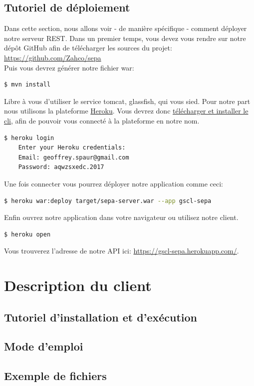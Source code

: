 \documentclass{article}
\begin{document}
    \subsection{Tutoriel de déploiement}
      Dans cette section, nous allons voir - de manière spécifique - comment déployer notre serveur REST.
      Dans un premier temps, vous devez vous rendre sur notre dépôt GitHub afin de télécharger les sources du projet:\\
      \url{https://github.com/Zahco/sepa}\\
      Puis vous devrez générer notre fichier war:
      \begin{lstlisting}[language=bash]
    $ mvn install
      \end{lstlisting}
      Libre à vous d'utiliser le service tomcat, glassfish, qui vous sied. Pour notre part nous utilisons la plateforme \href{https://www.heroku.com}{Heroku}.
      Vous devrez donc \href{https://devcenter.heroku.com/articles/heroku-cli}{télécharger et installer le cli}, afin de pouvoir vous connecté à la plateforme en notre nom.
      \begin{lstlisting}[language=bash]
    $ heroku login
    Enter your Heroku credentials:
    Email: geoffrey.spaur@gmail.com
    Password: aqwzsxedc.2017
      \end{lstlisting}
      Une fois connecter vous pourrez déployer notre application comme ceci:
      \begin{lstlisting}[language=bash]
    $ heroku war:deploy target/sepa-server.war --app gscl-sepa
      \end{lstlisting}
      Enfin ouvrez notre application dans votre navigateur ou utilisez notre client.
      \begin{lstlisting}[language=bash]
    $ heroku open
      \end{lstlisting}
      Vous trouverez l’adresse de notre API ici: \url{https://gscl-sepa.herokuapp.com/}.

  \newpage

  \section{ Description du client}
    \subsection{Tutoriel d'installation et d’exécution}
    \subsection{Mode d’emploi}
    \subsection{Exemple de fichiers}
\end{document}
